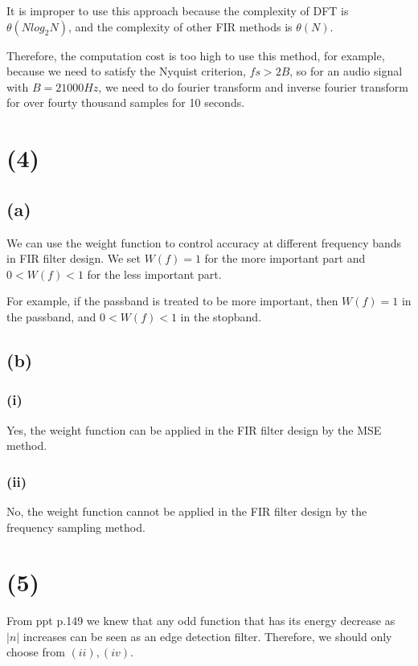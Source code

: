 \documentclass{article}
\begin{document}
It is improper to use this approach because the complexity of DFT is $\theta(N log_2 N)$,
and the complexity of other FIR methods is $\theta(N)$.  
\bigskip 

Therefore, the computation cost is too high to use this method, for example, 
because we need to satisfy the Nyquist criterion, $fs > 2B$, so for an audio signal with $B = 21000 Hz$, 
we need to do fourier transform and inverse fourier transform for over fourty thousand samples for 10 seconds.

\section*{(4)}

\subsection*{(a)}

We can use the weight function to control accuracy at different frequency bands in FIR filter design.  
We set $W(f) = 1$ for the more important part and $0 < W(f) < 1$ for the less important part.  
\bigskip

For example, if the passband is treated to be more important, 
then $W(f) = 1$ in the passband, and $0 < W(f) < 1$ in the stopband.


\subsection*{(b)}

\subsubsection*{(i)}

Yes, the weight function can be applied in the FIR filter design by the MSE method.  

\subsubsection*{(ii)}

No, the weight function cannot be applied in the FIR filter design by the frequency sampling method.  

\section*{(5)}

From ppt p.149 we knew that any odd function that has its energy decrease as $|n|$ increases can be seen as an edge detection filter.
Therefore, we should only choose from $(ii), (iv)$.
\end{document}
